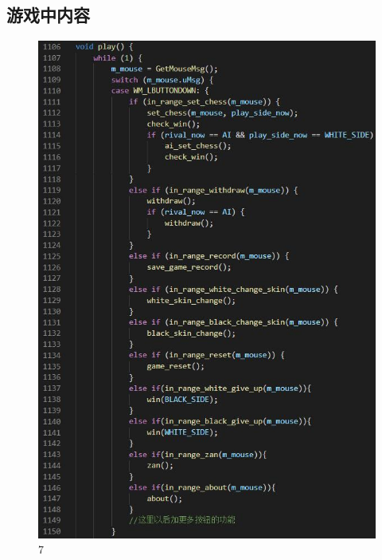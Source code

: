 \documentclass[UTF8]{ctexart}
\begin{document}
\subsection{游戏中内容}
\begin{figure}[H]
    \centering
    \includegraphics[scale=1.0]{6.jpg}
\caption{7}
\end{figure}
\end{document}
